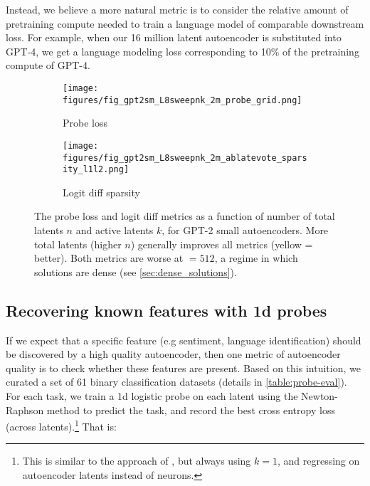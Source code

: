 Instead, we believe a more natural metric is to %
consider the relative amount of pretraining compute needed to train a language model of comparable downstream loss. For example, when our 16 million latent autoencoder is substituted into GPT-4, we get a language modeling loss corresponding to 10\% of the pretraining compute of GPT-4. %




\begin{figure*}[t!]
    \begin{subfigure}[b]{0.5\textwidth}
        \centering
        \texttt{[image: figures/fig\_gpt2sm\_L8sweepnk\_2m\_probe\_grid.png]}
        \caption{Probe loss}
        \label{fig:metric_grids_probe}
    \end{subfigure}%
    \begin{subfigure}[b]{0.5\textwidth}
        \centering
        \texttt{[image: figures/fig\_gpt2sm\_L8sweepnk\_2m\_ablatevote\_sparsity\_l1l2.png]}
        \caption{Logit diff sparsity}
        \label{fig:metric_grids_sparsity}
    \end{subfigure}
    \caption{The probe loss and logit diff metrics as a function of number of total latents $n$ and active latents $k$, for GPT-2 small autoencoders. More total latents (higher $n$) generally improves all metrics (yellow = better).  Both metrics are worse at \Lzero$=512$, a regime in which solutions are dense (see \autoref{sec:dense_solutions}). 
}
    \label{fig:metric_grids}
\end{figure*}

\subsection{Recovering known features with 1d probes}
\label{sec:probes}


If we expect that a specific feature (e.g sentiment, language identification) should be discovered by a high quality autoencoder, then one metric of autoencoder quality is to check whether these features are present.
Based on this intuition, we curated a set of 61 binary classification datasets (details in \autoref{table:probe-eval}). For each task, we train a 1d logistic probe on each latent using the Newton-Raphson method to predict the task, and record the best cross entropy loss (across latents).\footnote{This is similar to the approach of \citet{gurnee2023finding}, but always using $k = 1$, and regressing on autoencoder latents instead of neurons.}  That is:

